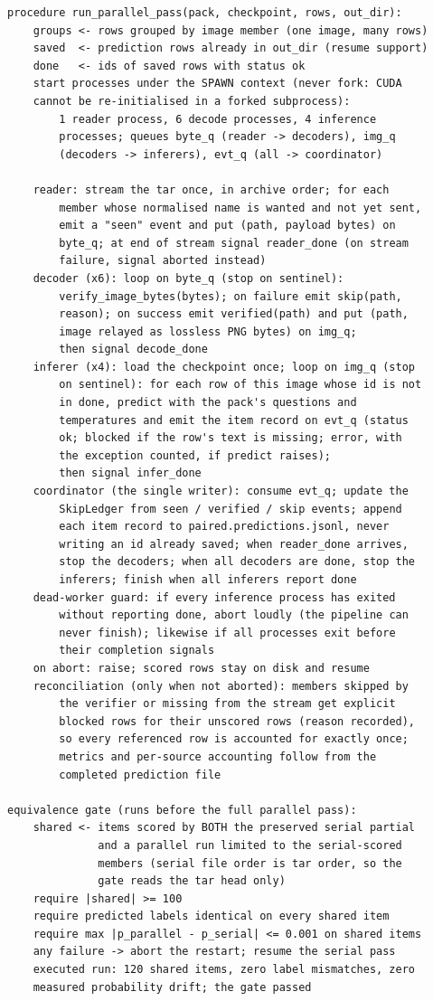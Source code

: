 \documentclass{article} %
\begin{document}
{\footnotesize\begin{verbatim}
procedure run_parallel_pass(pack, checkpoint, rows, out_dir):
    groups <- rows grouped by image member (one image, many rows)
    saved  <- prediction rows already in out_dir (resume support)
    done   <- ids of saved rows with status ok
    start processes under the SPAWN context (never fork: CUDA
    cannot be re-initialised in a forked subprocess):
        1 reader process, 6 decode processes, 4 inference
        processes; queues byte_q (reader -> decoders), img_q
        (decoders -> inferers), evt_q (all -> coordinator)

    reader: stream the tar once, in archive order; for each
        member whose normalised name is wanted and not yet sent,
        emit a "seen" event and put (path, payload bytes) on
        byte_q; at end of stream signal reader_done (on stream
        failure, signal aborted instead)
    decoder (x6): loop on byte_q (stop on sentinel):
        verify_image_bytes(bytes); on failure emit skip(path,
        reason); on success emit verified(path) and put (path,
        image relayed as lossless PNG bytes) on img_q;
        then signal decode_done
    inferer (x4): load the checkpoint once; loop on img_q (stop
        on sentinel): for each row of this image whose id is not
        in done, predict with the pack's questions and
        temperatures and emit the item record on evt_q (status
        ok; blocked if the row's text is missing; error, with
        the exception counted, if predict raises);
        then signal infer_done
    coordinator (the single writer): consume evt_q; update the
        SkipLedger from seen / verified / skip events; append
        each item record to paired.predictions.jsonl, never
        writing an id already saved; when reader_done arrives,
        stop the decoders; when all decoders are done, stop the
        inferers; finish when all inferers report done
    dead-worker guard: if every inference process has exited
        without reporting done, abort loudly (the pipeline can
        never finish); likewise if all processes exit before
        their completion signals
    on abort: raise; scored rows stay on disk and resume
    reconciliation (only when not aborted): members skipped by
        the verifier or missing from the stream get explicit
        blocked rows for their unscored rows (reason recorded),
        so every referenced row is accounted for exactly once;
        metrics and per-source accounting follow from the
        completed prediction file

equivalence gate (runs before the full parallel pass):
    shared <- items scored by BOTH the preserved serial partial
              and a parallel run limited to the serial-scored
              members (serial file order is tar order, so the
              gate reads the tar head only)
    require |shared| >= 100
    require predicted labels identical on every shared item
    require max |p_parallel - p_serial| <= 0.001 on shared items
    any failure -> abort the restart; resume the serial pass
    executed run: 120 shared items, zero label mismatches, zero
    measured probability drift; the gate passed
\end{verbatim}}
\end{document}
